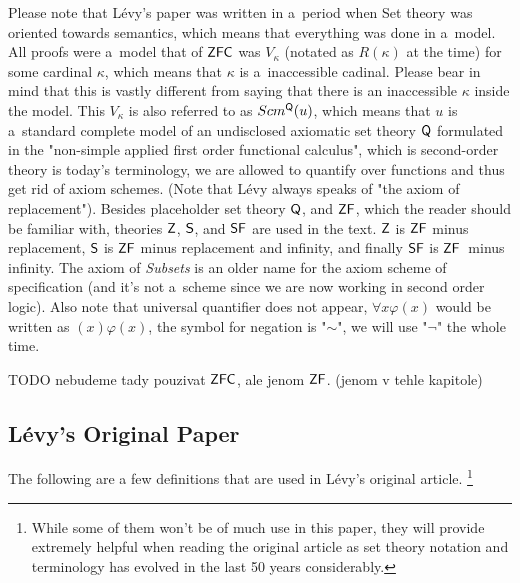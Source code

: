 \documentclass[12pt,a4paper]{article}
\begin{document}
Please note that Lévy's paper was written in a~period when Set theory was oriented towards semantics, which means that everything was done in a~model. 
All proofs were a~model that of $\sf{ZFC}$ was $V_\kappa$ (notated as $R(\kappa)$ at the time) for some cardinal $\kappa$, which means that $\kappa$ is a~inaccessible cadinal.  %
Please bear in mind that this is vastly different from saying that there is an inaccessible $\kappa$ inside the model. This $V_\kappa$ is also referred to as $Scm^{\sf{Q}}(u)$, which means that $u$ is a~standard complete model of an undisclosed axiomatic set theory $\sf{Q}$ formulated in the "non-simple applied first order functional calculus", which is second-order theory is today's terminology, we are allowed to quantify over functions and thus get rid of axiom schemes. (Note that Lévy always speaks of "the axiom of replacement"). Besides placeholder set theory $\sf{Q}$, and $\sf{ZF}$, which the reader should be familiar with, theories $\sf{Z}$, $\sf{S}$, and $\sf{SF}$ are used in the text. $\sf{Z}$ is $\sf{ZF}$ minus replacement, $\sf{S}$ is $\sf{ZF}$ minus replacement and infinity, and finally $\sf{SF}$ is $\sf{ZF}$ minus infinity. The axiom of \emph{Subsets} is an older name for the axiom scheme of specification (and it's not a~scheme since we are now working in second order logic). Also note that universal quantifier does not appear, $\forall x \varphi (x)$ would be written as $(x) \varphi (x)$, the symbol for negation is "$\sim$", we will use "$\neg$" the whole time.

TODO nebudeme tady pouzivat $\sf{ZFC}$, ale jenom $\sf{ZF}$. (jenom v tehle kapitole)


\subsection{Lévy's Original Paper}\label{sec:Levy1960}

The following are a few definitions that are used in Lévy's original article. \footnote{While some of them won't be of much use in this paper, they will provide extremely helpful when reading the original article as set theory notation and terminology has evolved in the last 50 years considerably.}
\end{document}
